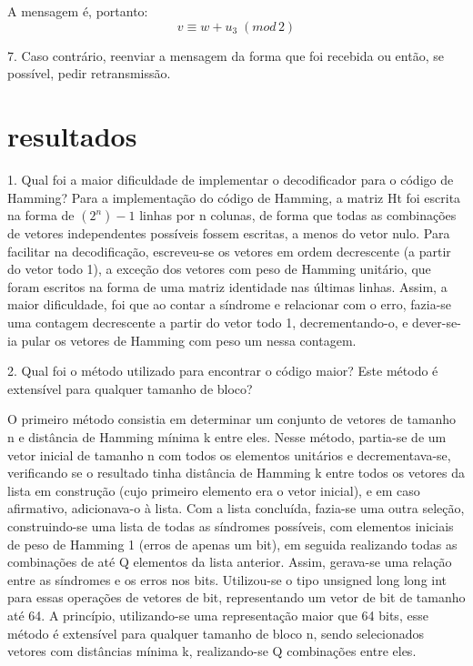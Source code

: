 \documentclass[%
aip,
jmp,%
amsmath,amssymb,
reprint,%
]{revtex4-1}
\begin{document}
	A mensagem é, portanto:
	\begin{equation}
	v \equiv w+u_3\; (mod\, 2)
	\end{equation}
	
	7. Caso contrário, reenviar a mensagem da forma que foi recebida ou então, se possível, pedir retransmissão.
	
	\section{resultados\label{sec:resultados}}
	
	1. Qual foi a maior dificuldade de implementar o decodificador para o código de Hamming?
	Para a implementação do código de Hamming, a matriz Ht foi escrita na forma de $(2^n)-1$ linhas por n colunas, de forma que todas as combinações de vetores independentes possíveis fossem escritas, a menos do vetor nulo. Para facilitar na decodificação, escreveu-se os vetores em ordem decrescente (a partir do vetor todo 1), a exceção dos vetores com peso de Hamming unitário, que foram escritos na forma de uma matriz identidade nas últimas linhas.
	Assim, a maior dificuldade, foi que ao contar a síndrome e relacionar com o erro, fazia-se uma contagem decrescente a partir do vetor todo 1, decrementando-o, e dever-se-ia pular os vetores de Hamming com peso um nessa contagem.
	
	2. Qual foi o método utilizado para encontrar o código maior? Este método é extensível para qualquer tamanho de bloco?
	
	O primeiro método consistia em determinar um conjunto de vetores de tamanho n e distância de Hamming mínima k entre eles. Nesse método, partia-se de um vetor inicial de tamanho n com todos os elementos unitários e decrementava-se, verificando se o resultado tinha distância de Hamming k entre todos os vetores da lista em construção (cujo primeiro elemento era o vetor inicial), e em caso afirmativo, adicionava-o à lista. Com a lista concluída, fazia-se uma outra seleção, construindo-se uma lista de todas as síndromes possíveis, com elementos iniciais de peso de Hamming 1 (erros de apenas um bit), em seguida realizando todas as combinações de até Q elementos da lista anterior. Assim, gerava-se uma relação entre as síndromes e os erros nos bits. 
	Utilizou-se o tipo unsigned long long int para essas operações de vetores de bit, representando um vetor de bit de tamanho até 64. A princípio, utilizando-se uma representação maior que 64 bits, esse método é extensível para qualquer tamanho de bloco n, sendo selecionados vetores com distâncias mínima k, realizando-se Q combinações entre eles. 
	
\end{document}
